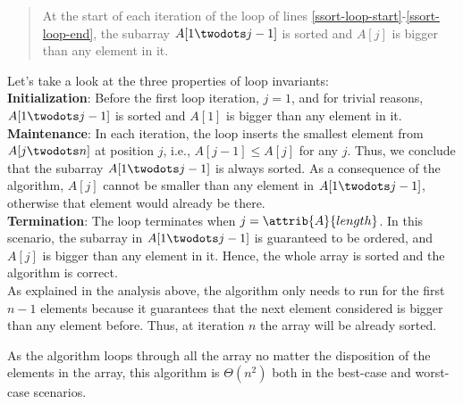 \documentclass[8pt,a4paper]{article}
\begin{document}
\begin{quotation}
  At the start of each iteration of the \For loop of lines \ref{ssort-loop-start}-\ref{ssort-loop-end},
  the subarray $A[1 \twodots j-1]$ is sorted and $A[j]$ is bigger than any element in it.
\end{quotation}

Let's take a look at the three properties of loop invariants: \\

\textbf{Initialization}: Before the first loop iteration, $j = 1$, and for trivial
reasons, $A[1 \twodots j-1]$ is sorted and $A[1]$ is bigger than any element in it. \\

\textbf{Maintenance}: In each iteration, the loop inserts the smallest element from
$A[j \twodots n]$ at position $j$, i.e., $A[j-1] \leq A[j]$ for any $j$. Thus, we conclude
that the subarray $A[1 \twodots j-1]$ is always sorted. As a consequence of the algorithm,
$A[j]$ cannot be smaller than any element in $A[1 \twodots j-1]$, otherwise that element
would already be there. \\

\textbf{Termination}: The loop terminates when $j = \attrib{A}{length}$. In this scenario,
the subarray in $A[1 \twodots j-1]$ is guaranteed to be ordered, and $A[j]$ is bigger than
any element in it. Hence, the whole array is sorted and the algorithm is correct. \\

As explained in the analysis above, the algorithm only needs to run for the first $n - 1$
elements because it guarantees that the next element considered is bigger than any element
before. Thus, at iteration $n$ the array will be already sorted.

As the algorithm loops through all the array no matter the disposition of the elements in
the array, this algorithm is $\Theta(n^{2})$ both in the best-case and worst-case scenarios.
\end{document}
